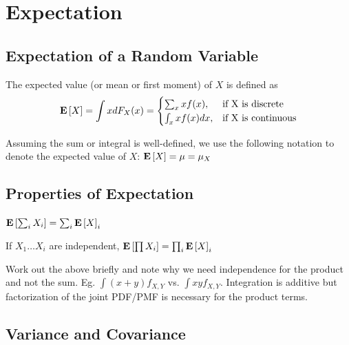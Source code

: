 \documentclass[10pt]{article}
\begin{document}
\setcounter{exercise}{19}
\begin{exercise}
\end{exercise}


\section{Expectation}

\subsection{Expectation of a Random Variable}

\begin{definition}
    The expected value (or mean or first moment) of $X$ is defined as 
    \[\operatorname{\mathbf{E}}\left[X\right] =
    \int x dF_X(x) = 
    \begin{cases} 
        \sum_x x f(x),&\text{if X is discrete}\\ 
        \int_x x f(x)dx,&\text{if X is continuous}\\ 
    \end{cases}\]

    Assuming the sum or integral is well-defined, we use the following notation
    to denote the expected value of $X$: $\operatorname{\mathbf{E}}\left[X\right] = \mu = \mu_X$
\end{definition}

\subsection{Properties of Expectation}

\begin{theorem}
    $\operatorname{\mathbf{E}}\left[\sum_i X_i\right] = \sum_i \operatorname{\mathbf{E}}\left[X\right]_i$
\end{theorem}

\begin{theorem}
    If $X_1 \dots X_i$ are independent, $\operatorname{\mathbf{E}}\left[\prod X_i\right] = \prod_i \operatorname{\mathbf{E}}\left[X\right]_i$
\end{theorem}

\begin{note}
    Work out the above briefly and note why we need
    independence for the product and not the sum. Eg. $\int (x + y)f_{X, Y}$
    vs. $\int xy f_{X, Y}$. Integration is additive but factorization of the
    joint PDF/PMF is necessary for the product terms.
\end{note}

\subsection{Variance and Covariance}
\end{document}
